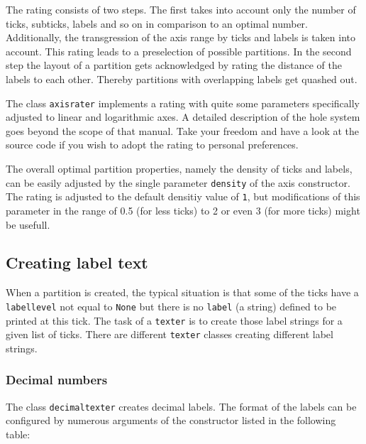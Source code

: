 The rating consists of two steps. The first takes into account only
the number of ticks, subticks, labels and so on in comparison to an
optimal number. Additionally, the transgression of the axis range by
ticks and labels is taken into account. This rating leads to a
preselection of possible partitions. In the second step the layout of
a partition gets acknowledged by rating the distance of the labels to
each other. Thereby partitions with overlapping labels get quashed
out.

The class \verb|axisrater| implements a rating with quite some
parameters specifically adjusted to linear and logarithmic axes. A
detailed description of the hole system goes beyond the scope of that
manual. Take your freedom and have a look at the \PyX{} source code if
you wish to adopt the rating to personal preferences.

The overall optimal partition properties, namely the density of ticks
and labels, can be easily adjusted by the single parameter
\verb|density| of the axis constructor. The rating is
adjusted to the default densitiy value of \verb|1|, but modifications
of this parameter in the range of 0.5 (for less ticks) to 2 or even 3
(for more ticks) might be usefull.

\subsection{Creating label text}

When a partition is created, the typical situation is that some of the
ticks have a \verb|labellevel| not equal to \verb|None| but there is
no \verb|label| (a string) defined to be printed at this tick. The
task of a \verb|texter| is to create those label strings for a given
list of ticks. There are different \verb|texter| classes creating
different label strings.

\subsubsection{Decimal numbers}

The class \verb|decimaltexter| creates decimal labels. The format of
the labels can be configured by numerous arguments of the constructor
listed in the following table:

